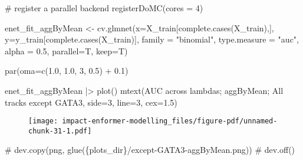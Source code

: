 \documentclass[
  letterpaper,
  DIV=11,
  numbers=noendperiod]{scrartcl}
\newenvironment{Shaded}{\begin{snugshade}}{\end{snugshade}}
\newcommand{\AttributeTok}[1]{\textcolor[rgb]{0.40,0.45,0.13}{#1}}
\newcommand{\CommentTok}[1]{\textcolor[rgb]{0.37,0.37,0.37}{#1}}
\newcommand{\DecValTok}[1]{\textcolor[rgb]{0.68,0.00,0.00}{#1}}
\newcommand{\FloatTok}[1]{\textcolor[rgb]{0.68,0.00,0.00}{#1}}
\newcommand{\FunctionTok}[1]{\textcolor[rgb]{0.28,0.35,0.67}{#1}}
\newcommand{\NormalTok}[1]{\textcolor[rgb]{0.00,0.23,0.31}{#1}}
\newcommand{\OtherTok}[1]{\textcolor[rgb]{0.00,0.23,0.31}{#1}}
\newcommand{\SpecialCharTok}[1]{\textcolor[rgb]{0.37,0.37,0.37}{#1}}
\newcommand{\StringTok}[1]{\textcolor[rgb]{0.13,0.47,0.30}{#1}}
\begin{document}
\begin{Shaded}
\begin{Highlighting}[]
\CommentTok{\# register a parallel backend }
\FunctionTok{registerDoMC}\NormalTok{(}\AttributeTok{cores =} \DecValTok{4}\NormalTok{)}
\end{Highlighting}
\end{Shaded}

\begin{Shaded}
\begin{Highlighting}[]
\NormalTok{enet\_fit\_aggByMean }\OtherTok{\textless{}{-}} \FunctionTok{cv.glmnet}\NormalTok{(}\AttributeTok{x=}\NormalTok{X\_train[}\FunctionTok{complete.cases}\NormalTok{(X\_train),], }\AttributeTok{y=}\NormalTok{y\_train[}\FunctionTok{complete.cases}\NormalTok{(X\_train)], }\AttributeTok{family =} \StringTok{"binomial"}\NormalTok{, }
\AttributeTok{type.measure =} \StringTok{"auc"}\NormalTok{, }\AttributeTok{alpha =} \FloatTok{0.5}\NormalTok{, }\AttributeTok{parallel=}\NormalTok{T, }\AttributeTok{keep=}\NormalTok{T)}
\end{Highlighting}
\end{Shaded}

\begin{Shaded}
\begin{Highlighting}[]
\FunctionTok{par}\NormalTok{(}\AttributeTok{oma=}\FunctionTok{c}\NormalTok{(}\FloatTok{1.0}\NormalTok{, }\FloatTok{1.0}\NormalTok{, }\DecValTok{3}\NormalTok{, }\FloatTok{0.5}\NormalTok{) }\SpecialCharTok{+} \FloatTok{0.1}\NormalTok{)}

\NormalTok{enet\_fit\_aggByMean }\SpecialCharTok{|\textgreater{}} \FunctionTok{plot}\NormalTok{()}
\FunctionTok{mtext}\NormalTok{(}\StringTok{\textquotesingle{}AUC across lambdas; aggByMean; All tracks except GATA3\textquotesingle{}}\NormalTok{, }\AttributeTok{side=}\DecValTok{3}\NormalTok{, }\AttributeTok{line=}\DecValTok{3}\NormalTok{, }\AttributeTok{cex=}\FloatTok{1.5}\NormalTok{)}
\end{Highlighting}
\end{Shaded}

\begin{figure}[H]

{\centering \texttt{[image: impact-enformer-modelling\_files/figure-pdf/unnamed-chunk-31-1.pdf]}

}

\end{figure}

\begin{Shaded}
\begin{Highlighting}[]
\CommentTok{\# dev.copy(png, glue(\textquotesingle{}\{plots\_dir\}/except{-}GATA3{-}aggByMean.png\textquotesingle{}))}
\CommentTok{\# dev.off()}
\end{Highlighting}
\end{Shaded}
\end{document}

